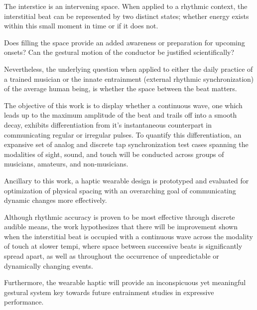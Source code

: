 
\setlength{\parskip}{1em}
\setlength{\parindent}{0em}

\noindent


The interstice is an intervening space. When applied to a rhythmic context, the interstitial beat can be represented by two distinct states; whether energy exists within this small moment in time or if it does not. 

Does filling the space provide an added awareness or preparation for upcoming onsets? Can the gestural motion of the conductor be justified scientifically?

Nevertheless, the underlying question when applied to either the daily practice of a trained musician or the innate entrainment (external rhythmic synchronization) of the average human being, is whether the space between the beat matters.

The objective of this work is to display whether a continuous wave, one which leads up to the maximum amplitude of the beat and trails off into a smooth decay, exhibits differentiation from it's instantaneous counterpart in communicating regular or irregular pulses. To quantify this differentiation, an expansive set of analog and discrete tap synchronization test cases spanning the modalities of sight, sound, and touch will be conducted across groups of musicians, amateurs, and non-musicians.

Ancillary to this work, a haptic wearable design is prototyped and evaluated for optimization of physical spacing with an overarching goal of communicating dynamic changes more effectively.

Although rhythmic accuracy is proven to be most effective through discrete audible means, the work hypothesizes that there will be improvement shown when the interstitial beat is occupied with a continuous wave across the modality of touch at slower tempi, where space between successive beats is significantly spread apart, as well as throughout the occurrence of unpredictable or dynamically changing events. 

Furthermore, the wearable haptic will provide an inconspicuous yet meaningful gestural system key towards future entrainment studies in expressive performance.
